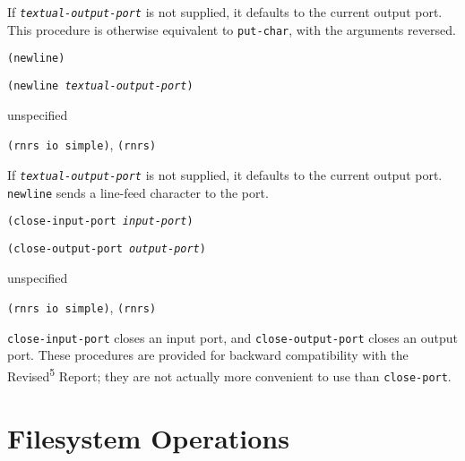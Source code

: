 If \texttt{\textit{textual-output-port}} is not supplied, it defaults to the current output port.
This procedure is otherwise equivalent to \texttt{put-char}, with the
arguments reversed.


\begin{description}

\label{io_s87}\item[procedure] \texttt{(newline)}



\item[procedure] \texttt{(newline \textit{textual-output-port})}



\item[returns] unspecified


\item[libraries] \texttt{(rnrs io simple)}, \texttt{(rnrs)}
\end{description}


If \texttt{\textit{textual-output-port}} is not supplied, it defaults to the current output port.
\texttt{newline} sends a line-feed character to the port.


\begin{description}

\label{io_s88}\item[procedure] \texttt{(close-input-port \textit{input-port})}



\item[procedure] \texttt{(close-output-port \textit{output-port})}



\item[returns] unspecified


\item[libraries] \texttt{(rnrs io simple)}, \texttt{(rnrs)}
\end{description}

\texttt{close-input-port} closes an input port, and
\texttt{close-output-port} closes an output port.
These procedures are provided for backward compatibility with the Revised\textsuperscript{5}
Report; they are not actually more convenient to use than \texttt{close-port}.


\section{\label{io_g131}\label{io_h10}Filesystem Operations\label{io_SECTFILESYSTEM}}



